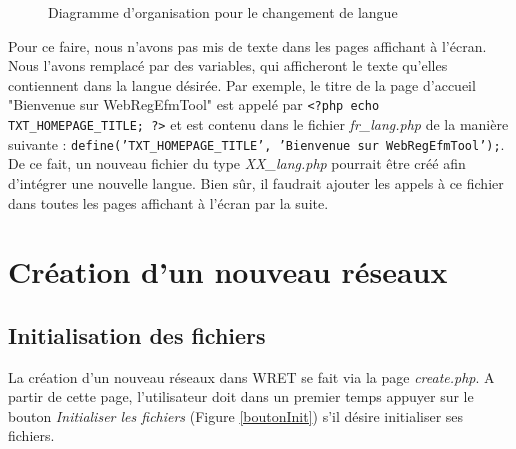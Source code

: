 \begin{figure}[!ht]
	\begin{center}
		\caption{Diagramme d'organisation pour le changement de langue}
  		\label{DiagLangues}
  	\end{center}	
\end{figure}

Pour ce faire, nous n'avons pas mis de texte dans les pages affichant à l'écran. Nous l'avons remplacé par des variables, qui afficheront le texte qu'elles contiennent dans la langue désirée. Par exemple, le titre de la page d'accueil "Bienvenue sur WebRegEfmTool" est appelé par \texttt{<?php echo TXT\_HOMEPAGE\_TITLE; ?>} et est contenu dans le fichier \emph{fr\_lang.php} de la manière suivante :
\texttt{define('TXT\_HOMEPAGE\_TITLE', 'Bienvenue sur WebRegEfmTool');}. De ce fait, un nouveau fichier du type \emph{XX\_lang.php} pourrait être créé afin d'intégrer une nouvelle langue. Bien sûr, il faudrait ajouter les appels à ce fichier dans toutes les pages affichant à l'écran par la suite. 

\section{Création d'un nouveau réseaux}

\subsection{Initialisation des fichiers}
La création d'un nouveau réseaux dans WRET se fait via la page \emph{create.php}.
A partir de cette page, l'utilisateur doit dans un premier temps appuyer sur le bouton \emph{Initialiser les fichiers} (Figure \ref{boutonInit}) s'il désire initialiser ses fichiers.

